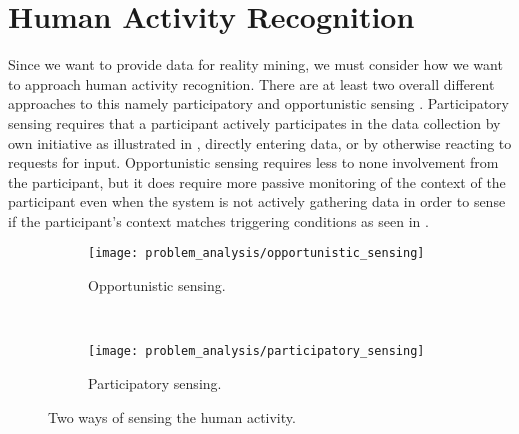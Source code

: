 
\section{Human Activity Recognition}
\label{sec:human_activity_recognition}

Since we want to provide data for reality mining, we must consider how we want to approach human activity recognition. There are at least two overall different approaches to this namely participatory and opportunistic sensing \parencite{opp_or_par} \parencite{har_wearables}. Participatory sensing requires that a participant actively participates in the data collection by own initiative as illustrated in , directly entering data, or by otherwise reacting to requests for input. Opportunistic sensing requires less to none involvement from the participant, but it does require more passive monitoring of the context of the participant even when the system is not actively gathering data in order to sense if the participant's context matches triggering conditions as seen in . 

\begin{figure}[!htbp]
\begin{subfigure}[!t]{.45\textwidth}
  \centering
  \texttt{[image: problem\_analysis/opportunistic\_sensing]}
  \caption{Opportunistic sensing.}
  \label{fig:opportunistic_sensing}
\end{subfigure}
~
\begin{subfigure}[!t]{.45\textwidth}
  \centering
  \texttt{[image: problem\_analysis/participatory\_sensing]}
  \caption{Participatory sensing.}
  \label{fig:participatory_sensing}
\end{subfigure}
\caption{Two ways of sensing the human activity.}
\label{fig:sensing_types}
\end{figure}
\FloatBarrier

